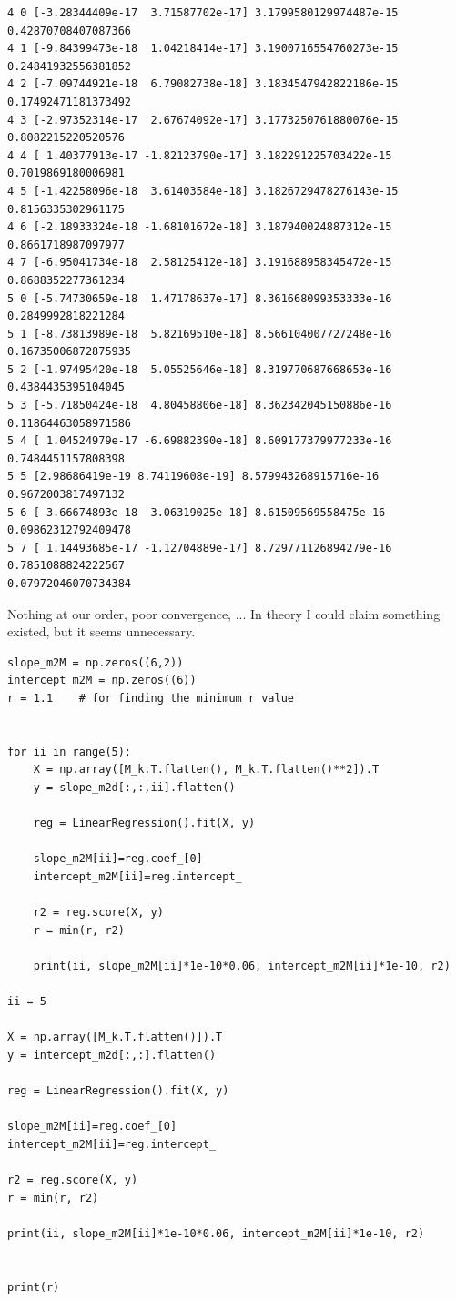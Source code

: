 \documentclass{article}
\begin{document}
\begin{verbatim}
4 0 [-3.28344409e-17  3.71587702e-17] 3.1799580129974487e-15 0.42870708407087366
4 1 [-9.84399473e-18  1.04218414e-17] 3.1900716554760273e-15 0.24841932556381852
4 2 [-7.09744921e-18  6.79082738e-18] 3.1834547942822186e-15 0.17492471181373492
4 3 [-2.97352314e-17  2.67674092e-17] 3.1773250761880076e-15 0.8082215220520576
4 4 [ 1.40377913e-17 -1.82123790e-17] 3.182291225703422e-15 0.7019869180006981
4 5 [-1.42258096e-18  3.61403584e-18] 3.1826729478276143e-15 0.8156335302961175
4 6 [-2.18933324e-18 -1.68101672e-18] 3.187940024887312e-15 0.8661718987097977
4 7 [-6.95041734e-18  2.58125412e-18] 3.191688958345472e-15 0.8688352277361234
5 0 [-5.74730659e-18  1.47178637e-17] 8.361668099353333e-16 0.2849992818221284
5 1 [-8.73813989e-18  5.82169510e-18] 8.566104007727248e-16 0.16735006872875935
5 2 [-1.97495420e-18  5.05525646e-18] 8.319770687668653e-16 0.4384435395104045
5 3 [-5.71850424e-18  4.80458806e-18] 8.362342045150886e-16 0.11864463058971586
5 4 [ 1.04524979e-17 -6.69882390e-18] 8.609177379977233e-16 0.7484451157808398
5 5 [2.98686419e-19 8.74119608e-19] 8.579943268915716e-16 0.9672003817497132
5 6 [-3.66674893e-18  3.06319025e-18] 8.61509569558475e-16 0.09862312792409478
5 7 [ 1.14493685e-17 -1.12704889e-17] 8.729771126894279e-16 0.7851088824222567
0.07972046070734384

\end{verbatim}

Nothing at our order, poor convergence, ... In theory I could claim something existed, but it seems unnecessary.

\begin{lstlisting}
slope_m2M = np.zeros((6,2))
intercept_m2M = np.zeros((6))
r = 1.1    # for finding the minimum r value


for ii in range(5):
    X = np.array([M_k.T.flatten(), M_k.T.flatten()**2]).T
    y = slope_m2d[:,:,ii].flatten()

    reg = LinearRegression().fit(X, y)

    slope_m2M[ii]=reg.coef_[0]
    intercept_m2M[ii]=reg.intercept_

    r2 = reg.score(X, y)
    r = min(r, r2)

    print(ii, slope_m2M[ii]*1e-10*0.06, intercept_m2M[ii]*1e-10, r2)

ii = 5

X = np.array([M_k.T.flatten()]).T
y = intercept_m2d[:,:].flatten()

reg = LinearRegression().fit(X, y)

slope_m2M[ii]=reg.coef_[0]
intercept_m2M[ii]=reg.intercept_

r2 = reg.score(X, y)
r = min(r, r2)

print(ii, slope_m2M[ii]*1e-10*0.06, intercept_m2M[ii]*1e-10, r2)


print(r)\end{lstlisting}
\end{document}

